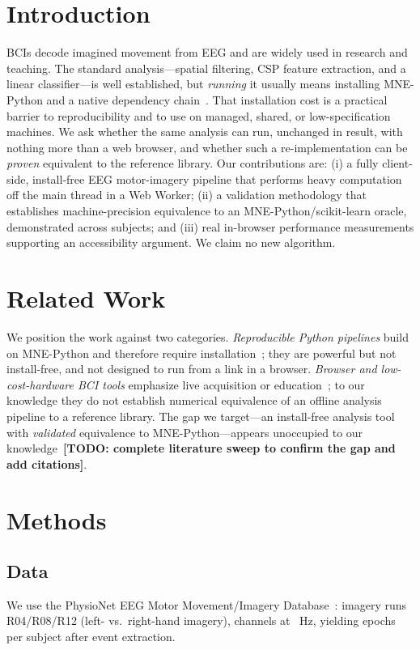 \documentclass[journal]{IEEEtran}
\newcommand{\todo}[1]{\textbf{[TODO: #1]}}
\begin{document}
\section{Introduction}
 BCIs decode imagined movement from EEG and are widely used in
research and teaching. The standard analysis---spatial filtering, CSP feature extraction, and a
linear classifier---is well established, but \emph{running} it usually means installing MNE-Python
and a native dependency chain~\cite{gramfort2013mne}. That installation cost is a practical barrier
to reproducibility and to use on managed, shared, or low-specification machines. We ask whether the
same analysis can run, unchanged in result, with nothing more than a web browser, and whether such a
re-implementation can be \emph{proven} equivalent to the reference library. Our contributions are:
(i) a fully client-side, install-free EEG motor-imagery pipeline that performs heavy computation off
the main thread in a Web Worker; (ii) a validation methodology that establishes machine-precision
equivalence to an MNE-Python/scikit-learn oracle, demonstrated across \Nsubjects{} subjects; and
(iii) real in-browser performance measurements supporting an accessibility argument. We claim no new
algorithm.

\section{Related Work}
We position the work against two categories. \emph{Reproducible Python pipelines} build on
MNE-Python and therefore require installation~\cite{mnebidspipeline,meggie,eegpipeline,pylossless,eegpype};
they are powerful but not install-free, and not designed to run from a link in a browser.
\emph{Browser and low-cost-hardware BCI tools} emphasize live acquisition or
education~\cite{webbci,bci2000web,neuroblock,pieeg}; to our knowledge they do not establish numerical
equivalence of an offline analysis pipeline to a reference library. The gap we target---an
install-free analysis tool with \emph{validated} equivalence to MNE-Python---appears unoccupied to
our knowledge~\todo{complete literature sweep to confirm the gap and add citations}.

\section{Methods}
\subsection{Data}
We use the PhysioNet EEG Motor Movement/Imagery Database~\cite{schalk2004bci2000,goldberger2000physionet}:
imagery runs R04/R08/R12 (left- vs.\ right-hand imagery), \Nchannels{} channels at \Fs~Hz, yielding
\Nepochs{} epochs per subject after event extraction.
\end{document}
